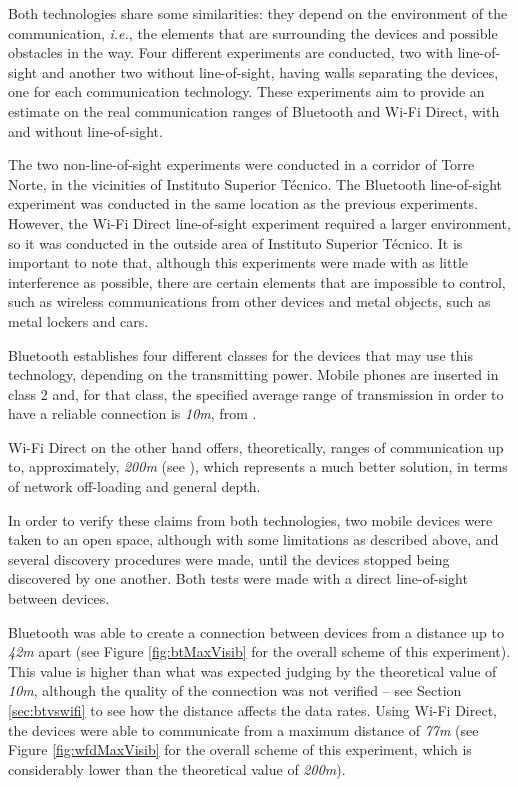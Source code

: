 Both technologies share some similarities: they depend on the environment of the communication, \textit{i.e.}, the elements that are surrounding the devices and possible obstacles in the way. Four different experiments are conducted, two with line-of-sight and another two without line-of-sight, having walls separating the devices, one for each communication technology. These experiments aim to provide an estimate on the real communication ranges of Bluetooth and Wi-Fi Direct, with and without line-of-sight.

The two non-line-of-sight experiments were conducted in a corridor of Torre Norte, in the vicinities of Instituto Superior Técnico. The Bluetooth line-of-sight experiment was conducted in the same location as the previous experiments. However, the Wi-Fi Direct line-of-sight experiment required a larger environment, so it was conducted in the outside area of Instituto Superior Técnico. It is important to note that, although this experiments were made with as little interference as possible, there are certain elements that are impossible to control, such as wireless communications from other devices and metal objects, such as metal lockers and cars.

Bluetooth establishes four different classes for the devices that may use this technology, depending on the transmitting power. Mobile phones are inserted in class 2 and, for that class, the specified average range of transmission in order to have a reliable connection is \textit{10m}, from \cite{bluetooth}.

Wi-Fi Direct on the other hand offers, theoretically, ranges of communication up to, approximately, \textit{200m} (see \cite{wfdrange}), which represents a much better solution, in terms of network off-loading and general depth.

In order to verify these claims from both technologies, two mobile devices were taken to an open space, although with some limitations as described above, and several discovery procedures were made, until the devices stopped being discovered by one another. Both tests were made with a direct line-of-sight between devices.

Bluetooth was able to create a connection between devices from a distance up to \textit{42m} apart (see Figure \ref{fig:btMaxVisib} for the overall scheme of this experiment). This value is higher than what was expected judging by the theoretical value of \textit{10m}, although the quality of the connection was not verified -- see Section \ref{sec:btvswifi} to see how the distance affects the data rates. Using Wi-Fi Direct, the devices were able to communicate from a maximum distance of \textit{77m} (see Figure \ref{fig:wfdMaxVisib} for the overall scheme of this experiment, which is considerably lower than the theoretical value of \textit{200m}).

